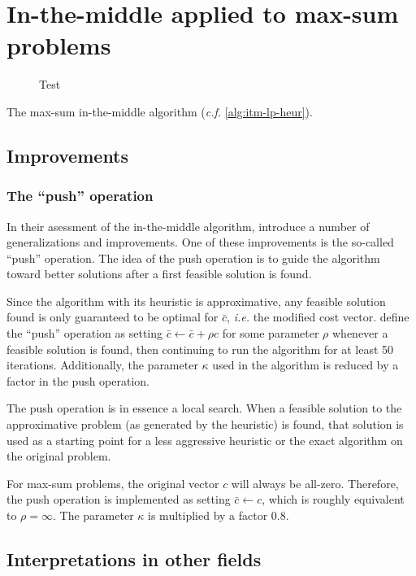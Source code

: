 \section{In-the-middle applied to max-sum problems}

\begin{figure}
	\subfloat[Test]{}
	\caption{Test}
\end{figure}

\begin{algorithm}[tbp]

	\caption{The max-sum in-the-middle algorithm (\emph{c.f.} \cref{alg:itm-lp-heur}).}
	\label{alg:itm-max-sum}
\end{algorithm}

\subsection{Improvements}


\subsubsection{The \enquote{push} operation}
In their asessment of the in-the-middle algorithm, \textcite{Bastert10} introduce a number of generalizations and improvements.
One of these improvements is the so-called \enquote{push} operation.
The idea of the push operation is to guide the algorithm toward better solutions after a first feasible solution is found.

Since the algorithm with its heuristic is approximative, any feasible solution found is only guaranteed to be optimal for \(\bar{c}\), \emph{i.e.} the modified cost vector.
 define the \enquote{push} operation \parencite[\pno~100]{Bastert10} as setting \(\bar{c} \leftarrow \bar{c} + \rho c\) for some parameter \(\rho\) whenever a feasible solution is found, then continuing to run the algorithm for at least 50 iterations.
Additionally, the parameter \(\kappa\) used in the algorithm is reduced by a factor in the push operation.

The push operation is in essence a local search.
When a feasible solution to the approximative problem (as generated by the heuristic) is found, that solution is used as a starting point for a less aggressive heuristic or the exact algorithm on the original problem.

For max-sum problems, the original vector \(c\) will always be all-zero.
Therefore, the push operation is implemented as setting \(\bar{c} \leftarrow c\), which is roughly equivalent to \(\rho=\infty\).
The parameter \(\kappa\) is multiplied by a factor \num{0.8}.


\subsection{Interpretations in other fields}
